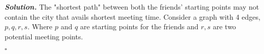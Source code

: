 \documentclass[12pt]{article}
\newenvironment{solution}[1][\it{Solution}]{\textbf{#1. } }{$\square$}
\begin{document}
\begin{solution}
 The "shortest path" between both the friends' starting points may not contain the city that avails shortest meeting time. Consider a graph with 4 edges, $p,q,r,s$. Where $p$ and $q$ are starting points for the friends and $r,s$ are two potential meeting points. 


\begin{center}
\end{center}


\end{solution}
\end{document}

